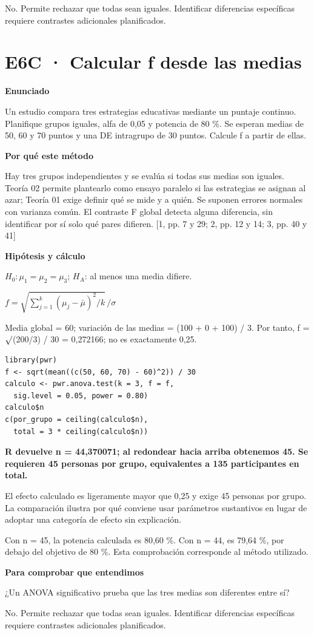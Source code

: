 \documentclass[10pt,a4paper]{article}
\newcommand{\etiqueta}[1]{\par{\bfseries\color{Blue}#1}\par}
\newcommand{\cajares}[1]{\par\colorbox{Pale}{\parbox{\dimexpr\linewidth-2\fboxsep}{\vspace{4pt}\textbf{\color{Navy}#1}\vspace{4pt}}}\par}
\begin{document}
{\small No. Permite rechazar que todas sean iguales. Identificar diferencias específicas requiere contrastes adicionales planificados.}
\clearpage
\section*{E6C · Calcular f desde las medias}
\etiqueta{Enunciado}
Un estudio compara tres estrategias educativas mediante un puntaje continuo. Planifique grupos iguales, alfa de 0,05 y potencia de 80 \%. Se esperan medias de 50, 60 y 70 puntos y una DE intragrupo de 30 puntos. Calcule f a partir de ellas.
\etiqueta{Por qué este método}
Hay tres grupos independientes y se evalúa si todas sus medias son iguales. Teoría 02 permite plantearlo como ensayo paralelo si las estrategias se asignan al azar; Teoría 01 exige definir qué se mide y a quién. Se suponen errores normales con varianza común. El contraste F global detecta alguna diferencia, sin identificar por sí solo qué pares difieren. [1, pp. 7 y 29; 2, pp. 12 y 14; 3, pp. 40 y 41]
\etiqueta{Hipótesis y cálculo}
$H_0:\mu_1=\mu_2=\mu_3$; $H_A$: al menos una media difiere.

$f=\sqrt{\sum_{j=1}^{k}(\mu_j-\bar\mu)^2/k}\,/\sigma$

Media global = 60; variación de las medias = (100 + 0 + 100) / 3. Por tanto, f = \ensuremath{\surd}(200/3) / 30 = 0,272166; no es exactamente 0,25.
\begin{Verbatim}
library(pwr)
f <- sqrt(mean((c(50, 60, 70) - 60)^2)) / 30
calculo <- pwr.anova.test(k = 3, f = f,
  sig.level = 0.05, power = 0.80)
calculo$n
c(por_grupo = ceiling(calculo$n),
  total = 3 * ceiling(calculo$n))
\end{Verbatim}
\cajares{R devuelve n = 44,370071; al redondear hacia arriba obtenemos 45. Se requieren 45 personas por grupo, equivalentes a 135 participantes en total.}
El efecto calculado es ligeramente mayor que 0,25 y exige 45 personas por grupo. La comparación ilustra por qué conviene usar parámetros sustantivos en lugar de adoptar una categoría de efecto sin explicación.

{\small\color{Gray}Con n = 45, la potencia calculada es 80,60 \%. Con n = 44, es 79,64 \%, por debajo del objetivo de 80 \%. Esta comprobación corresponde al método utilizado.}
\etiqueta{Para comprobar que entendimos}
¿Un ANOVA significativo prueba que las tres medias son diferentes entre sí?

{\small No. Permite rechazar que todas sean iguales. Identificar diferencias específicas requiere contrastes adicionales planificados.}
\clearpage
\end{document}
